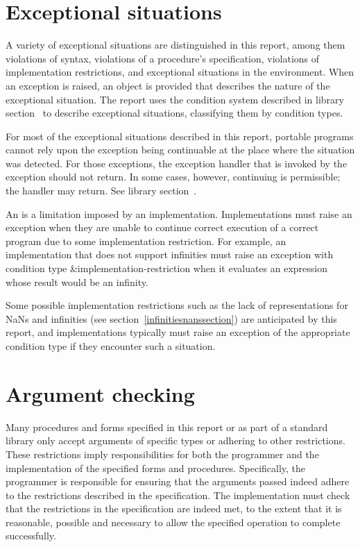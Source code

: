 \section{Exceptional situations}
\label{exceptionalsituationsection}

A variety of exceptional situations
are distinguished in this report, among them violations of 
syntax, violations of a procedure's specification, violations of
implementation restrictions, and exceptional situations in the
environment.  When an exception is raised, an object is provided that
describes the nature of the exceptional situation.  The report uses
the condition system described in library section~ to
describe exceptional situations, classifying them by condition types.

For most of the exceptional situations described in this report,
portable programs cannot rely upon the exception being continuable
at the place where the situation was detected.
For those exceptions, the exception handler that is invoked by the
exception should not return.
In some cases, however, continuing is permissible; the
handler may return.  See library section~.

An  is a limitation imposed by an
implementation.  Implementations must raise an exception
when they are unable to continue correct execution
of a correct program due to some implementation restriction.  For
example, an implementation that does not support infinities
must raise an exception with condition type
{\cf\&implementation-restriction} when it evaluates an expression
whose result would be an infinity.

Some possible implementation restrictions such as the lack of
representations for NaNs and infinities (see
section~\ref{infinitiesnanssection}) are anticipated by this report,
and implementations typically must raise an exception of the
appropriate condition type if they encounter such a situation.

\section{Argument checking}
\label{argumentcheckingsection}

Many procedures and forms specified in this report or as part of a
standard library only accept arguments of specific types or adhering
to other restrictions.  These restrictions imply responsibilities for
both the programmer and the implementation of the specified forms and
procedures.  Specifically, the programmer is responsible for ensuring
that the arguments passed indeed adhere to the restrictions described
in the specification.  The implementation must check
that the restrictions in the specification are indeed met, to the
extent that it is reasonable, possible and necessary to allow the
specified operation to complete successfully.

